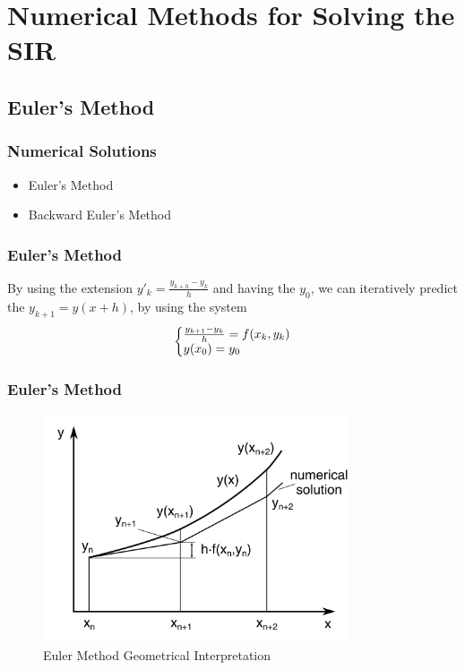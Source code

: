 \documentclass{beamer}
\makeatletter
\newenvironment{system}%
{\left\lbrace\begin{array}{@{}l@{}}}%
{\end{array}\right.}
\makeatother
\begin{document}
\section{Numerical Methods for Solving the SIR}
\subsection{Euler's Method}

\begin{frame}\frametitle{Numerical Solutions}
\begin{itemize}
\item Euler's Method
\item Backward Euler's Method
\end{itemize}
\end{frame}

\begin{frame}\frametitle{Euler's Method}
    By using the extension $y'_k=\frac{y_{k+h}-y_k}{h}$ and having the
$y_0$, we can iteratively predict the $y_{k+1}=y(x+h)$, by using the system
\vspace{1.5cm}
\large
\begin{equation*}
    \begin{system}
        \frac{y_{k+1}-y_k}{h}=f(x_k, y_k)
        \\
        y(x_0)=y_0
    \end{system}
\end{equation*}

\end{frame}

\begin{frame}\frametitle{Euler's Method}
    \begin{figure}
        \caption{Euler Method Geometrical Interpretation}
        \centering
        \includegraphics[width=9cm]{Figure_Euler_geom.png}
    \end{figure}
\end{frame}
\end{document}
